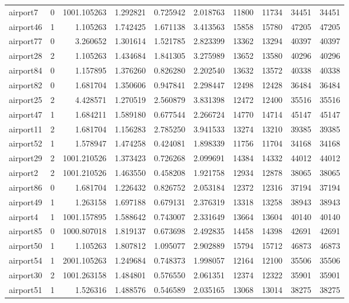 \begin{longtable}{|l|r|r|r|r|r|r|r|r|r|}
airport7 & 0 & 1001.105263 & 1.292821 & 0.725942 & 2.018763 & 11800 & 11734 & 34451 & 34451 \\
airport46 & 1 & 1.105263 & 1.742425 & 1.671138 & 3.413563 & 15858 & 15780 & 47205 & 47205 \\
airport77 & 0 & 3.260652 & 1.301614 & 1.521785 & 2.823399 & 13362 & 13294 & 40397 & 40397 \\
airport28 & 2 & 1.105263 & 1.434684 & 1.841305 & 3.275989 & 13652 & 13580 & 40296 & 40296 \\
airport84 & 0 & 1.157895 & 1.376260 & 0.826280 & 2.202540 & 13632 & 13572 & 40338 & 40338 \\
airport82 & 0 & 1.681704 & 1.350606 & 0.947841 & 2.298447 & 12498 & 12428 & 36484 & 36484 \\
airport25 & 2 & 4.428571 & 1.270519 & 2.560879 & 3.831398 & 12472 & 12400 & 35516 & 35516 \\
airport47 & 1 & 1.684211 & 1.589180 & 0.677544 & 2.266724 & 14770 & 14714 & 45147 & 45147 \\
airport11 & 2 & 1.681704 & 1.156283 & 2.785250 & 3.941533 & 13274 & 13210 & 39385 & 39385 \\
airport52 & 1 & 1.578947 & 1.474258 & 0.424081 & 1.898339 & 11756 & 11704 & 34168 & 34168 \\
airport29 & 2 & 1001.210526 & 1.373423 & 0.726268 & 2.099691 & 14384 & 14332 & 44012 & 44012 \\
airport2 & 2 & 1001.210526 & 1.463550 & 0.458208 & 1.921758 & 12934 & 12878 & 38065 & 38065 \\
airport86 & 0 & 1.681704 & 1.226432 & 0.826752 & 2.053184 & 12372 & 12316 & 37194 & 37194 \\
airport49 & 1 & 1.263158 & 1.697188 & 0.679131 & 2.376319 & 13318 & 13258 & 38943 & 38943 \\
airport4 & 1 & 1001.157895 & 1.588642 & 0.743007 & 2.331649 & 13664 & 13604 & 40140 & 40140 \\
airport85 & 0 & 1000.807018 & 1.819137 & 0.673698 & 2.492835 & 14458 & 14398 & 42691 & 42691 \\
airport50 & 1 & 1.105263 & 1.807812 & 1.095077 & 2.902889 & 15794 & 15712 & 46873 & 46873 \\
airport54 & 1 & 2001.105263 & 1.249684 & 0.748373 & 1.998057 & 12164 & 12100 & 35506 & 35506 \\
airport30 & 2 & 1001.263158 & 1.484801 & 0.576550 & 2.061351 & 12374 & 12322 & 35901 & 35901 \\
airport51 & 1 & 1.526316 & 1.488576 & 0.546589 & 2.035165 & 13068 & 13014 & 38275 & 38275 \\

\end{longtable}
